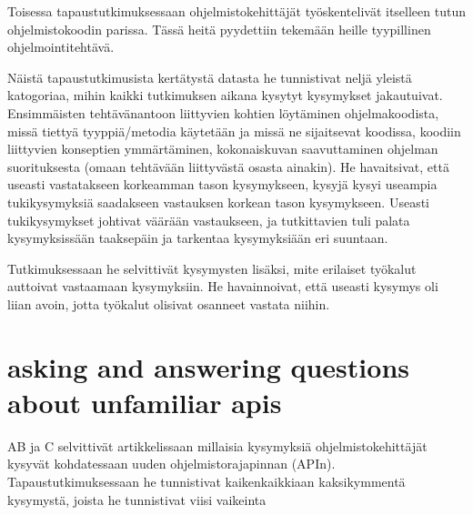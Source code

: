 \documentclass[finnish]{../tktltiki2}
\theoremstyle{definition}
\theoremstyle{remark}
\begin{document}
Toisessa tapaustutkimuksessaan ohjelmistokehittäjät työskentelivät itselleen tutun ohjelmistokoodin parissa. Tässä heitä pyydettiin tekemään heille tyypillinen ohjelmointitehtävä.

Näistä tapaustutkimusista kertätystä datasta he tunnistivat neljä yleistä katogoriaa, mihin kaikki tutkimuksen aikana kysytyt kysymykset jakautuivat.
Ensimmäisten tehtävänantoon liittyvien kohtien löytäminen ohjelmakoodista, missä tiettyä tyyppiä/metodia käytetään ja missä ne sijaitsevat koodissa, koodiin liittyvien konseptien ymmärtäminen, kokonaiskuvan saavuttaminen ohjelman suorituksesta (omaan tehtävään liittyvästä osasta ainakin).
He havaitsivat, että useasti vastatakseen korkeamman tason kysymykseen, kysyjä kysyi useampia tukikysymyksiä saadakseen vastauksen korkean tason kysymykseen. Useasti tukikysymykset johtivat väärään vastaukseen, ja tutkittavien tuli palata kysymyksissään taaksepäin ja tarkentaa kysymyksiään eri suuntaan.

Tutkimuksessaan he selvittivät kysymysten lisäksi, mite erilaiset työkalut auttoivat vastaamaan kysymyksiin. He havainnoivat, että useasti kysymys oli liian avoin, jotta työkalut olisivat osanneet vastata niihin.
\section{asking and answering questions about unfamiliar apis}
AB ja C selvittivät artikkelissaan \cite{asking-and-answering-api-questions} millaisia kysymyksiä ohjelmistokehittäjät kysyvät kohdatessaan uuden ohjelmistorajapinnan (APIn).
Tapaustutkimuksessaan he tunnistivat kaikenkaikkiaan kaksikymmentä kysymystä, joista he tunnistivat viisi vaikeinta
\end{document}
